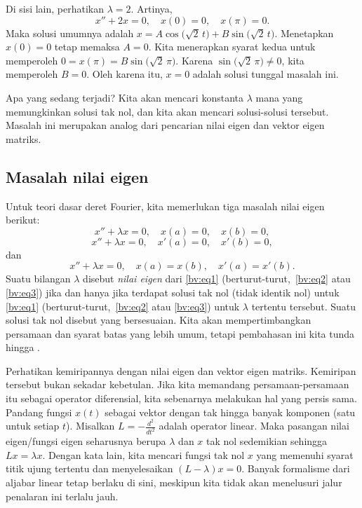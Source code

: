 \begin{example}
Di sisi lain, perhatikan $\lambda = 2$.  Artinya,
\begin{equation*}
x'' + 2 x = 0, \quad x(0) = 0, \quad x(\pi) = 0.
\end{equation*}
Maka solusi umumnya adalah
$x= A \cos \bigl( \sqrt{2}\,t\bigr)
+ B \sin \bigl( \sqrt{2}\,t\bigr)$.
Menetapkan $x(0) = 0$ tetap memaksa $A = 0$.
Kita menerapkan syarat kedua untuk memperoleh
$0=x(\pi) = B \sin \bigl( \sqrt{2}\,\pi\bigr)$.
Karena $\sin \bigl( \sqrt{2}\,\pi\bigr) \neq 0$, kita memperoleh
$B = 0$.  Oleh karena itu, $x=0$ adalah solusi tunggal masalah ini.
\end{example}

Apa yang sedang terjadi?  Kita akan mencari konstanta
$\lambda$ mana yang memungkinkan solusi tak nol, dan kita akan mencari
solusi-solusi tersebut.  Masalah ini merupakan analog dari pencarian
nilai eigen dan vektor eigen matriks.

\subsection{Masalah nilai eigen}

Untuk teori dasar deret Fourier, kita memerlukan
tiga masalah nilai eigen berikut:
\begin{equation} \label{bv:eq1}
x'' + \lambda x = 0, \quad x(a) = 0, \quad x(b) = 0 ,
\end{equation}
\begin{equation} \label{bv:eq2}
x'' + \lambda x = 0, \quad x'(a) = 0, \quad x'(b) = 0 ,
\end{equation}
dan
\begin{equation} \label{bv:eq3}
x'' + \lambda x = 0, \quad x(a) = x(b), \quad x'(a) = x'(b) .
\end{equation}
Suatu bilangan $\lambda$ disebut
\emph{nilai eigen}
dari \eqref{bv:eq1}
(berturut-turut,\ \eqref{bv:eq2} atau \eqref{bv:eq3}) jika dan hanya jika
terdapat solusi tak nol (tidak identik nol) untuk \eqref{bv:eq1}
(berturut-turut,\ \eqref{bv:eq2} atau \eqref{bv:eq3})
untuk $\lambda$ tertentu tersebut.  Suatu
solusi tak nol disebut
\emph{} yang bersesuaian.
Kita akan mempertimbangkan persamaan dan syarat batas yang lebih umum,
tetapi pembahasan ini kita tunda hingga
.

Perhatikan kemiripannya dengan nilai eigen dan vektor eigen matriks.  Kemiripan
tersebut bukan sekadar kebetulan.  Jika kita memandang persamaan-persamaan itu sebagai
operator diferensial, kita sebenarnya melakukan hal yang persis sama.
Pandang fungsi $x(t)$
sebagai vektor dengan tak hingga banyak komponen (satu untuk setiap $t$).
Misalkan $L = -\frac{d^2}{{dt}^2}$ adalah operator linear.
Maka pasangan nilai eigen/fungsi eigen seharusnya berupa $\lambda$ dan
$x$ tak nol sedemikian sehingga $Lx = \lambda x$.
Dengan kata lain,
kita mencari fungsi tak nol $x$
yang memenuhi syarat titik ujung tertentu dan menyelesaikan
$(L- \lambda)x = 0$.  Banyak formalisme dari aljabar linear tetap
berlaku di sini, meskipun kita tidak akan menelusuri jalur penalaran ini terlalu jauh.

